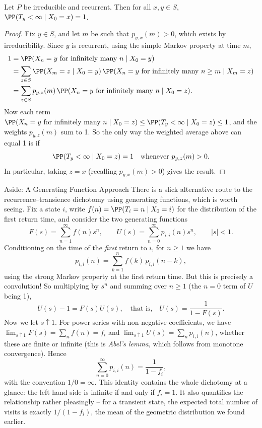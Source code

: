 \documentclass[a4paper]{scrartcl}
\begin{document}
\begin{theorem}
	Let $P$ be irreducible and recurrent. Then for all $x, y \in S$, $\PP(T_y < \infty \mid X_0 = x) = 1$.
\end{theorem}
\begin{proof}
	Fix $y \in S$, and let $m$ be such that $p_{y, x}(m) > 0$, which exists by irreducibility. Since $y$ is recurrent, using the simple Markov property at time $m$,
	\begin{align*}
		1 &= \PP(X_n = y \text{ for infinitely many } n \mid X_0 = y) \\
		&= \sum_{z \in S} \PP(X_m = z \mid X_0 = y) \, \PP(X_n = y \text{ for infinitely many } n \geq m \mid X_m = z) \\
		&= \sum_{z \in S} p_{y, z}(m) \, \PP(X_n = y \text{ for infinitely many } n \mid X_0 = z).
	\end{align*}
	Now each term $\PP(X_n = y \text{ for infinitely many } n \mid X_0 = z) \leq \PP(T_y < \infty \mid X_0 = z) \leq 1$, and the weights $p_{y, z}(m)$ sum to 1. So the only way the weighted average above can equal 1 is if
	$$
	\PP(T_y < \infty \mid X_0 = z) = 1 \quad \text{whenever } p_{y, z}(m) > 0.
	$$
	In particular, taking $z = x$ (recalling $p_{y,x}(m) > 0$) gives the result.
\end{proof}

\begin{aside}{Aside: A Generating Function Approach}
	There is a slick alternative route to the recurrence--transience dichotomy using generating functions, which is worth seeing. Fix a state $i$, write $f(n) = \PP(T_i = n \mid X_0 = i)$ for the distribution of the first return time, and consider the two generating functions
	$$
	F(s) = \sum_{n = 1}^{\infty} f(n)s^n, \qquad U(s) = \sum_{n = 0}^{\infty} p_{i, i}(n) s^n, \qquad |s| < 1.
	$$
	Conditioning on the time of the \emph{first} return to $i$, for $n \geq 1$ we have
	$$
	p_{i, i}(n) = \sum_{k = 1}^{n} f(k)\, p_{i, i}(n - k),
	$$
	using the strong Markov property at the first return time. But this is precisely a convolution! So multiplying by $s^n$ and summing over $n \geq 1$ (the $n = 0$ term of $U$ being 1),
	$$
	U(s) - 1 = F(s)U(s), \quad \text{that is,} \quad U(s) = \frac{1}{1 - F(s)}.
	$$
	Now we let $s \uparrow 1$. For power series with non-negative coefficients, we have $\lim_{s \uparrow 1} F(s) = \sum_n f(n) = f_i$ and $\lim_{s \uparrow 1} U(s) = \sum_n p_{i, i}(n)$, whether these are finite or infinite (this is \emph{Abel's lemma}, which follows from monotone convergence). Hence
	$$
	\sum_{n = 0}^{\infty} p_{i, i}(n) = \frac{1}{1 - f_i},
	$$
	with the convention $1/0 = \infty$. This identity contains the whole dichotomy at a glance: the left hand side is infinite if and only if $f_i = 1$. It also quantifies the relationship rather pleasingly -- for a transient state, the expected total number of visits is exactly $1/(1 - f_i)$, the mean of the geometric distribution we found earlier.

\end{aside}
\end{document}
